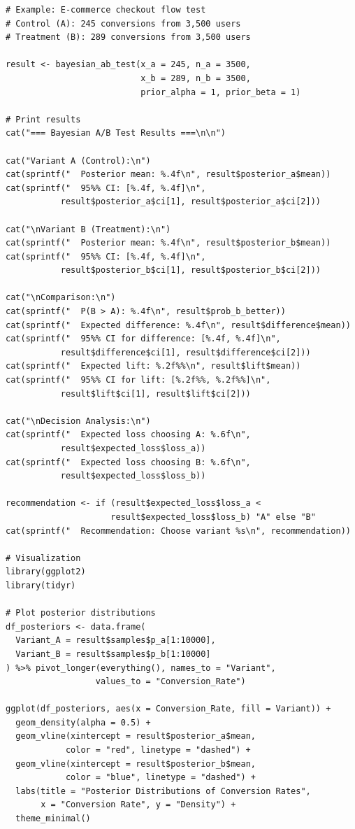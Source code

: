 \begin{lstlisting}
# Example: E-commerce checkout flow test
# Control (A): 245 conversions from 3,500 users
# Treatment (B): 289 conversions from 3,500 users

result <- bayesian_ab_test(x_a = 245, n_a = 3500,
                           x_b = 289, n_b = 3500,
                           prior_alpha = 1, prior_beta = 1)

# Print results
cat("=== Bayesian A/B Test Results ===\n\n")

cat("Variant A (Control):\n")
cat(sprintf("  Posterior mean: %.4f\n", result$posterior_a$mean))
cat(sprintf("  95%% CI: [%.4f, %.4f]\n",
           result$posterior_a$ci[1], result$posterior_a$ci[2]))

cat("\nVariant B (Treatment):\n")
cat(sprintf("  Posterior mean: %.4f\n", result$posterior_b$mean))
cat(sprintf("  95%% CI: [%.4f, %.4f]\n",
           result$posterior_b$ci[1], result$posterior_b$ci[2]))

cat("\nComparison:\n")
cat(sprintf("  P(B > A): %.4f\n", result$prob_b_better))
cat(sprintf("  Expected difference: %.4f\n", result$difference$mean))
cat(sprintf("  95%% CI for difference: [%.4f, %.4f]\n",
           result$difference$ci[1], result$difference$ci[2]))
cat(sprintf("  Expected lift: %.2f%%\n", result$lift$mean))
cat(sprintf("  95%% CI for lift: [%.2f%%, %.2f%%]\n",
           result$lift$ci[1], result$lift$ci[2]))

cat("\nDecision Analysis:\n")
cat(sprintf("  Expected loss choosing A: %.6f\n",
           result$expected_loss$loss_a))
cat(sprintf("  Expected loss choosing B: %.6f\n",
           result$expected_loss$loss_b))

recommendation <- if (result$expected_loss$loss_a <
                     result$expected_loss$loss_b) "A" else "B"
cat(sprintf("  Recommendation: Choose variant %s\n", recommendation))

# Visualization
library(ggplot2)
library(tidyr)

# Plot posterior distributions
df_posteriors <- data.frame(
  Variant_A = result$samples$p_a[1:10000],
  Variant_B = result$samples$p_b[1:10000]
) %>% pivot_longer(everything(), names_to = "Variant",
                  values_to = "Conversion_Rate")

ggplot(df_posteriors, aes(x = Conversion_Rate, fill = Variant)) +
  geom_density(alpha = 0.5) +
  geom_vline(xintercept = result$posterior_a$mean,
            color = "red", linetype = "dashed") +
  geom_vline(xintercept = result$posterior_b$mean,
            color = "blue", linetype = "dashed") +
  labs(title = "Posterior Distributions of Conversion Rates",
       x = "Conversion Rate", y = "Density") +
  theme_minimal()


\end{lstlisting}
